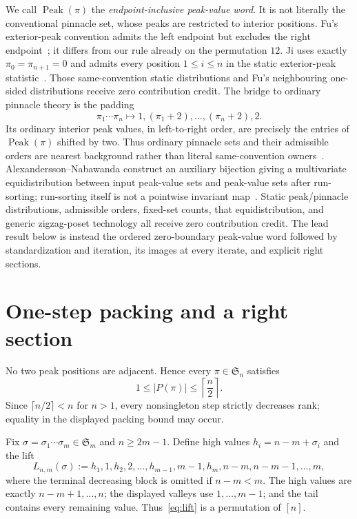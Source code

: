 \documentclass[a4paper,10pt]{amsart}
\theoremstyle{definition}
\theoremstyle{remark}
\newcommand{\Sn}{\mathfrak S}
\newcommand{\Peak}{\operatorname{Peak}}
\begin{document}
We call $\Peak(\pi)$ the \emph{endpoint-inclusive peak-value word}.  It is
not literally the conventional pinnacle set, whose peaks are restricted to
interior positions.  Fu's exterior-peak convention admits the left endpoint
but excludes the right endpoint~\citep{Fu2018}; it differs from our rule
already on the permutation $12$.  Ji uses exactly
$\pi_0=\pi_{n+1}=0$ and admits every position $1\le i\le n$ in the static
exterior-peak statistic~\citep{Ji2025}.  Those same-convention static
distributions and Fu's neighbouring one-sided distributions receive zero
contribution credit.  The bridge to ordinary pinnacle theory is the
padding
\[
       \pi_1\cdots\pi_n\longmapsto
       1,(\pi_1+2),\ldots,(\pi_n+2),2.
\]
Its ordinary interior peak values, in left-to-right order, are precisely the
entries of $\Peak(\pi)$ shifted by two.  Thus ordinary pinnacle sets and
their admissible orders are nearest background rather than literal
same-convention owners~\citep{DavisEtAl2018,RusuTenner2021,
DiazLopezEtAl2021,DomagalskiEtAl2022,Fang2022,FalqueEtAl2024}.
Alexandersson--Nabawanda construct an auxiliary bijection giving a
multivariate equidistribution between input peak-value sets and peak-value
sets after run-sorting; run-sorting itself is not a pointwise invariant
map~\citep{AlexanderssonNabawanda2022}.  Static peak/pinnacle distributions,
admissible orders, fixed-set counts, that equidistribution, and generic
zigzag-poset technology all receive zero contribution credit.  The lead
result below is instead the ordered zero-boundary peak-value word followed by
standardization and iteration, its images at every iterate, and explicit
right sections.

\section{One-step packing and a right section}

No two peak positions are adjacent.  Hence every $\pi\in\Sn_n$ satisfies
\begin{equation}\label{eq:packing}
                    1\le |P(\pi)|\le\left\lceil\frac n2\right\rceil.
\end{equation}
Since $\lceil n/2\rceil<n$ for $n>1$, every nonsingleton step strictly
decreases rank; equality in the displayed packing bound may occur.

Fix $\sigma=\sigma_1\cdots\sigma_m\in\Sn_m$ and $n\ge2m-1$.  Define high
values $h_i=n-m+\sigma_i$ and the lift
\begin{equation}\label{eq:lift}
 L_{n,m}(\sigma):=
 h_1,1,h_2,2,\ldots,h_{m-1},m-1,h_m,
 n-m,n-m-1,\ldots,m,
\end{equation}
where the terminal decreasing block is omitted if $n-m<m$.  The high values
are exactly $n-m+1,\ldots,n$; the displayed valleys use $1,\ldots,m-1$; and
the tail contains every remaining value.  Thus~\eqref{eq:lift} is a
permutation of $[n]$.
\end{document}
